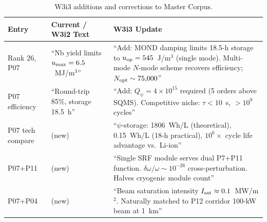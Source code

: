 \documentclass[aps,prd,twocolumn,superscriptaddress]{revtex4-2}
\begin{document}
\begin{table}[h]
\caption{W3i3 additions and corrections to Master Corpus.}
\label{tab:corpus}
\begin{ruledtabular}
\begin{tabular}{lp{3.0cm}p{3.0cm}}
Entry & Current / W3i2 Text & W3i3 Update \\
\hline
Rank 26, P07 & ``Nb yield limits $u_{\rm max} = 6.5$~MJ/m$^3$'' &
``Add: MOND damping limits 18.5-h storage to $u_{\rm op} = 545$~J/m$^3$ (single mode).
Multi-mode $N$-mode scheme recovers efficiency; $N_{\rm opt} \sim 75{,}000$'' \\
\hline
P07 efficiency & ``Round-trip 85\%, storage 18.5~h'' &
``Add: $Q_\psi = 4\times 10^{15}$ required (5 orders above SQMS).
Competitive niche: $\tau < 10$~s, $>10^9$ cycles'' \\
\hline
P07 tech compare & (new) &
``$\psi$-storage: 1806~Wh/L (theoretical), 0.15~Wh/L (18-h practical),
$10^6\times$ cycle life advantage vs.\ Li-ion'' \\
\hline
P07+P11 & (new) &
``Single SRF module serves dual P7+P11 function.
$\delta\omega/\omega \sim 10^{-26}$ cross-perturbation.
Halves cryogenic module count'' \\
\hline
P07+P04 & (new) &
``Beam saturation intensity $I_{\rm sat} \approx 0.1$~MW/m$^2$.
Naturally matched to P12 corridor 100-kW beam at 1~km'' \\
\end{tabular}
\end{ruledtabular}
\end{table}
\end{document}
